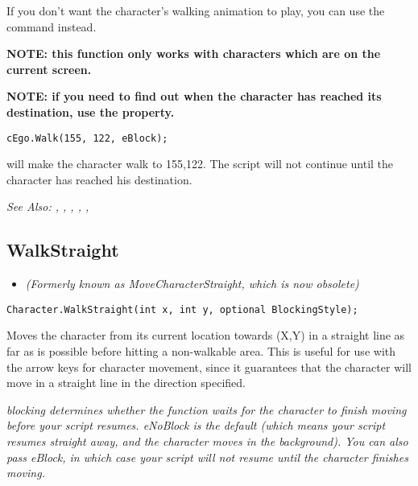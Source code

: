 If you don't want the character's walking animation to play, you can use the
 command instead.

\bf{NOTE:} this function only works with characters which are on the current screen.

\bf{NOTE:} if you need to find out when the character has reached its destination,
use the  property.

\begin{verbatim}
cEgo.Walk(155, 122, eBlock);
\end{verbatim}
will make the character walk to 155,122. The script will not continue until the
character has reached his destination.

\it{See Also:} ,
,
,
,
,


\subsection{WalkStraight}\label{Character.WalkStraight}%

\begin{itemize}
\item \it{(Formerly known as MoveCharacterStraight, which is now obsolete)}
\end{itemize}

\begin{verbatim}
Character.WalkStraight(int x, int y, optional BlockingStyle);
\end{verbatim}
Moves the character from its current location towards (X,Y) in a straight
line as far as is possible before hitting a non-walkable area. This is
useful for use with the arrow keys for character movement, since it
guarantees that the character will move in a straight line in the direction
specified.

\it{blocking} determines whether the function waits for the character to finish moving
before your script resumes. eNoBlock is the default (which means your script
resumes straight away, and the character moves in the background). You can also pass
eBlock, in which case your script will not resume until the character finishes moving.

